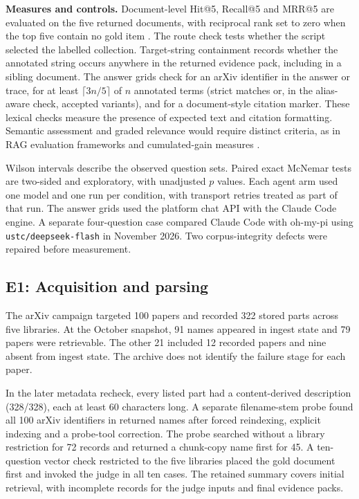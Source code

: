 \textbf{Measures and controls.} Document-level Hit@5, Recall@5 and
MRR@5 are evaluated on the five returned documents, with reciprocal rank set
to zero when the top five contain no gold item \citep{craswell-msmarco-2021}.
The route check tests whether the script selected the labelled collection.
Target-string containment records whether the annotated string occurs
anywhere in the returned evidence pack, including in a sibling document.
The answer grids check for an arXiv identifier in the answer or trace,
for at least $\lceil 3n/5\rceil$ of $n$ annotated terms (strict matches or,
in the alias-aware check, accepted variants), and for a document-style
citation marker. These lexical checks measure the presence of expected
text and citation formatting. Semantic assessment and graded relevance
would require distinct criteria, as in RAG evaluation frameworks
\citep{es-ragas-2024,saad-falcon-ares-2024} and cumulated-gain measures
\citep{jarvelin-cumulated-gain-2002}.

Wilson intervals describe the observed question sets. Paired exact
McNemar tests are two-sided and exploratory, with unadjusted $p$ values.
Each agent arm used one model and one run per condition, with transport
retries treated as part of that run. The answer grids used the platform chat
API with the Claude Code engine. A separate four-question case compared
Claude Code with oh-my-pi using \texttt{ustc/deepseek-flash} in November
2026. Two corpus-integrity defects were repaired before measurement.

\subsection{E1: Acquisition and parsing}
\label{sec:e1}
The arXiv campaign targeted 100 papers and recorded 322 stored parts
across five libraries. At the October snapshot, 91 names appeared in ingest
state and 79 papers were retrievable. The other 21 included 12 recorded
papers and nine absent from ingest state. The archive does not identify
the failure stage for each paper.

In the later metadata recheck, every listed part had a content-derived
description (328/328), each at least 60 characters long. A separate
filename-stem probe found all 100 arXiv identifiers in returned names after
forced reindexing, explicit indexing and a probe-tool correction. The probe
searched without a library restriction for 72 records and returned a
chunk-copy name first for 45. A ten-question vector check restricted to
the five libraries placed the gold document first and invoked the judge in
all ten cases. The retained summary covers initial retrieval, with
incomplete records for the judge inputs and final evidence packs.

